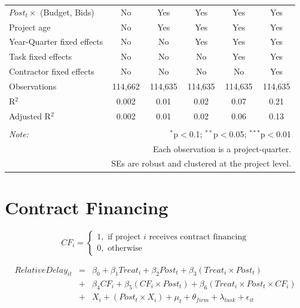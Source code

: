 \documentclass[
]{article}
\begin{document}
\begin{table}[H]
\begin{tabular}{@{\extracolsep{-2pt}}lccccc}
$Post_t \times$  (Budget, Bids) & No & Yes & Yes & Yes & Yes \\ 
Project age & No & Yes & Yes & Yes & Yes \\ 
Year-Quarter fixed effects & No & No & Yes & Yes & Yes \\ 
Task fixed effects & No & No & No & Yes & Yes \\ 
Contractor fixed effects & No & No & No & No & Yes \\ 
Observations & 114,662 & 114,635 & 114,635 & 114,635 & 114,635 \\ 
R$^{2}$ & 0.002 & 0.01 & 0.02 & 0.07 & 0.21 \\ 
Adjusted R$^{2}$ & 0.002 & 0.01 & 0.02 & 0.06 & 0.13 \\ 
\hline 
\hline \\[-1.8ex] 
\textit{Note:}  & \multicolumn{5}{r}{$^{*}$p$<$0.1; $^{**}$p$<$0.05; $^{***}$p$<$0.01} \\ 
 & \multicolumn{5}{r}{Each observation is a project-quarter.} \\ 
 & \multicolumn{5}{r}{SEs are robust and clustered at the project level.} \\ 
\end{tabular} 
\end{table}

\hypertarget{contract-financing}{%
\section{Contract Financing}\label{contract-financing}}

\[ CF_i = \begin{cases} 1, \text{ if project } i \text{ receives contract financing}\\
0, \text{ otherwise} \end{cases}\]

\[ \begin{aligned}
RelativeDelay_{it} &=& \beta_0+\beta_1 Treat_i + \beta_2 Post_t + \beta_3 (Treat_i \times Post_t) \\
&+&\beta_4 CF_i + \beta_5 (CF_i \times Post_t) + \beta_6 (Treat_i \times Post_t \times CF_i) \\ 
&+&X_i + (Post_t \times X_i) + \mu_t + \theta_{firm} + \lambda_{task}+ \epsilon_{it}
\end{aligned}\]
\end{document}
